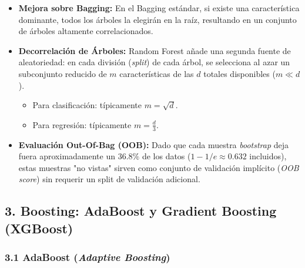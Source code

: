 \begin{itemize}
	\item \textbf{Mejora sobre Bagging:} En el Bagging estándar, si existe una característica dominante, todos los árboles la elegirán en la raíz, resultando en un conjunto de árboles altamente correlacionados.
	
	\item \textbf{Decorrelación de Árboles:} Random Forest añade una segunda fuente de aleatoriedad: en cada división (\emph{split}) de cada árbol, se selecciona al azar un subconjunto reducido de $m$ características de las $d$ totales disponibles ($m \ll d$).
	\begin{itemize}
		\item Para clasificación: típicamente $m = \sqrt{d}$.
		\item Para regresión: típicamente $m = \frac{d}{3}$.
	\end{itemize}
	
	\item \textbf{Evaluación Out-Of-Bag (OOB):} Dado que cada muestra \emph{bootstrap} deja fuera aproximadamente un $36.8\%$ de los datos ($1 - 1/e \approx 0.632$ incluidos), estas muestras "no vistas" sirven como conjunto de validación implícito (\emph{OOB score}) sin requerir un split de validación adicional.
\end{itemize}

\subsection{3. Boosting: AdaBoost y Gradient Boosting (XGBoost)}

\subsubsection{3.1 AdaBoost (\emph{Adaptive Boosting})}

